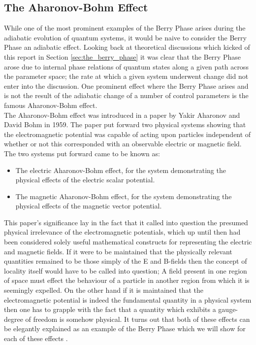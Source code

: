 \documentclass{article}
\begin{document}
\subsection{The Aharonov-Bohm Effect}\label{ssec:aharonov_bohm_effect}

While one of the most prominent examples of the Berry Phase arises during the adiabatic evolution of quantum systems, it would be naive to consider the Berry Phase an adiabatic effect. Looking back at theoretical discussions which kicked of this report in Section \ref{sec:the_berry_phase} it was clear that the Berry Phase arose due to internal phase relations of quantum states along a given path across the parameter space; the rate at which a given system underwent change did not enter into the discussion. One prominent effect where the Berry Phase arises and is not the result of the adiabatic change of a number of control parameters is the famous Aharonov-Bohm effect.\\

The Aharonov-Bohm effect was introduced in a paper by Yakir Aharonov and David Bohm in 1959. The paper put forward two physical systems showing that the electromagnetic potential was capable of acting upon particles independent of whether or not this corresponded with an observable electric or magnetic field. The two systems put forward came to be known as:

\begin{itemize}
  \item The electric Aharonov-Bohm effect, for the system demonstrating the physical effects of the electric scalar potential.
  \item The magnetic Aharonov-Bohm effect, for the system demonstrating the physical effects of the magnetic vector potential.
\end{itemize}

This paper's significance lay in the fact that it called into question the presumed physical irrelevance of the electromagnetic potentials, which up until then had been considered solely useful mathematical constructs for representing the electric and magnetic fields. If it were to be maintained that the physically relevant quantities remained to be those simply of the E and B-fields then the concept of locality itself would have to be called into question; A field present in one region of space must effect the behaviour of a particle in another region from which it is seemingly expelled. On the other hand if it is maintained that the electromagnetic potential is indeed the fundamental quantity in a physical system then one has to grapple with the fact that a quantity which exhibits a gauge-degree of freedom is somehow physical. It turns out that both of these effects can be elegantly explained as an example of the Berry Phase which we will show for each of these effects \cite{Aharonov1959}.
\end{document}
